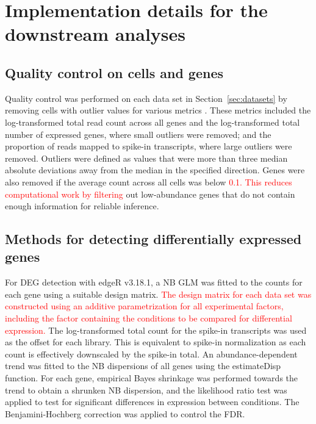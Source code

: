 \documentclass{article}
\newcommand\revised[1]{\textcolor{red}{#1}}
\begin{document}
\section{Implementation details for the downstream analyses}

\subsection{Quality control on cells and genes}
Quality control was performed on each data set in Section~\ref{sec:datasets} by removing cells with outlier values for various metrics \citep{lun2016stepbystep}.
These metrics included the log-transformed total read count across all genes and the log-transformed total number of expressed genes, where small outliers were removed; 
and the proportion of reads mapped to spike-in transcripts, where large outliers were removed.
Outliers were defined as values that were more than three median absolute deviations away from the median in the specified direction.
Genes were also removed if the average count across all cells was below \revised{0.1.
This reduces computational work by filtering} out low-abundance genes that do not contain enough information for reliable inference.

\subsection{Methods for detecting differentially expressed genes}
For DEG detection with edgeR v3.18.1, a NB GLM was fitted to the counts for each gene \citep{mccarthy2012differential} using a suitable design matrix.
\revised{The design matrix for each data set was constructed using an additive parametrization for all experimental factors, including the factor containing the conditions to be compared for differential expression.}
The log-transformed total count for the spike-in transcripts was used as the offset for each library.
This is equivalent to spike-in normalization as each count is effectively downscaled by the spike-in total.
An abundance-dependent trend was fitted to the NB dispersions of all genes using the estimateDisp function.
For each gene, empirical Bayes shrinkage was performed towards the trend to obtain a shrunken NB dispersion, and the likelihood ratio test was applied to test for significant differences in expression between conditions.
The Benjamini-Hochberg correction was applied to control the FDR.
\end{document}
